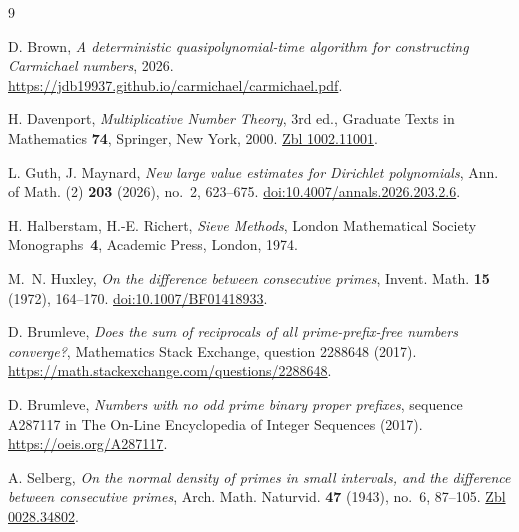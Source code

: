 \documentclass[11pt]{amsart}
\begin{document}
\begin{thebibliography}{9}

 D. Brown,
\emph{A deterministic quasipolynomial-time algorithm for constructing
Carmichael numbers}, 2026.
\url{https://jdb19937.github.io/carmichael/carmichael.pdf}.

 H. Davenport,
\emph{Multiplicative Number Theory}, 3rd ed., Graduate Texts in
Mathematics \textbf{74}, Springer, New York, 2000.
\href{https://zbmath.org/?q=an:1002.11001}{Zbl 1002.11001}.

 L. Guth, J. Maynard,
\emph{New large value estimates for Dirichlet polynomials},
Ann. of Math. (2) \textbf{203} (2026), no.~2, 623--675.
\href{https://doi.org/10.4007/annals.2026.203.2.6}{doi:10.4007/annals.2026.203.2.6}.

 H. Halberstam, H.-E. Richert,
\emph{Sieve Methods}, London Mathematical Society Monographs~\textbf{4},
Academic Press, London, 1974.

 M.~N. Huxley,
\emph{On the difference between consecutive primes},
Invent. Math. \textbf{15} (1972), 164--170.
\href{https://doi.org/10.1007/BF01418933}{doi:10.1007/BF01418933}.

 D. Brumleve,
\emph{Does the sum of reciprocals of all prime-prefix-free numbers
converge?}, Mathematics Stack Exchange, question 2288648 (2017).
\url{https://math.stackexchange.com/questions/2288648}.

 D. Brumleve,
\emph{Numbers with no odd prime binary proper prefixes}, sequence A287117
in The On-Line Encyclopedia of Integer Sequences (2017).
\url{https://oeis.org/A287117}.

 A. Selberg,
\emph{On the normal density of primes in small intervals, and the
difference between consecutive primes},
Arch. Math. Naturvid. \textbf{47} (1943), no.~6, 87--105.
\href{https://zbmath.org/?q=an:0028.34802}{Zbl 0028.34802}.

\end{thebibliography}
\end{document}
